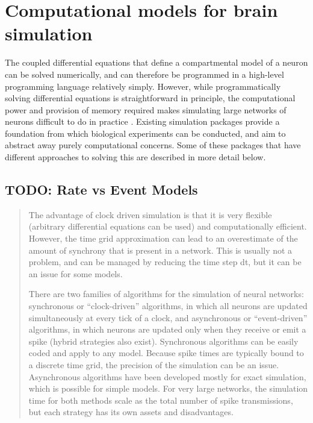 

\section{Computational models for brain simulation}

The coupled differential equations that define a compartmental model of a neuron
can be solved numerically, and can therefore be programmed in a high-level
programming language relatively simply. However, while programmatically solving
differential equations is straightforward in principle, the computational power
and provision of memory required makes simulating large networks of neurons
difficult to do in practice \autocite{trappenberg_fundamentals_2009}. Existing
simulation packages provide a foundation from which biological experiments can
be conducted, and aim to abstract away purely computational concerns. Some of
these packages that have different approaches to solving this are described in
more detail below.

\subsection{TODO: Rate vs Event Models}

\begin{quote}
    The advantage of clock driven simulation is that it is very flexible
    (arbitrary differential equations can be used) and computationally
    efficient. However, the time grid approximation can lead to an overestimate
    of the amount of synchrony that is present in a network. This is usually not
    a problem, and can be managed by reducing the time step dt, but it can be an
    issue for some models.
    
    There are two families of algorithms for the simulation of neural networks: synchronous or “clock-driven” algorithms, in which all neurons are updated simultaneously at every tick of a clock, and asynchronous or “event-driven” algorithms, in which neurons are updated only when they receive or emit a spike (hybrid strategies also exist). Synchronous algorithms can be easily coded and apply to any model. Because spike times are typically bound to a discrete time grid, the precision of the simulation can be an issue. Asynchronous algorithms have been developed mostly for exact simulation, which is possible for simple models. For very large networks, the simulation time for both methods scale as the total number of spike transmissions, but each strategy has its own assets and disadvantages.
\end{quote}

